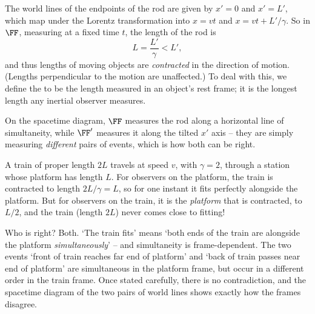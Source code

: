 \documentclass[a4paper]{scrartcl}
\begin{document}
The world lines of the endpoints of the rod are given by $x' = 0$ and $x' = L'$, which map under the Lorentz transformation into $x = vt$ and $x = vt + L'/\gamma$.
So in $\FF$, measuring at a fixed time $t$, the length of the rod is
$$
L = \frac{L'}{\gamma} < L',
$$
and thus lengths of moving objects are \emph{contracted} in the direction of motion. (Lengths perpendicular to the motion are unaffected.) To deal with this, we define the  to be the length measured in an object's rest frame; it is the longest length any inertial observer measures.

\begin{center}
\end{center}

On the spacetime diagram, $\FF$ measures the rod along a horizontal line of simultaneity, while $\FF'$ measures it along the tilted $x'$ axis -- they are simply measuring \emph{different} pairs of events, which is how both can be right.

\begin{example}
	A train of proper length $2L$ travels at speed $v$, with $\gamma = 2$, through a station whose platform has length $L$. For observers on the platform, the train is contracted to length $2L/\gamma = L$, so for one instant it fits perfectly alongside the platform. But for observers on the train, it is the \emph{platform} that is contracted, to $L/2$, and the train (length $2L$) never comes close to fitting!

	Who is right? Both. `The train fits' means `both ends of the train are alongside the platform \emph{simultaneously}' -- and simultaneity is frame-dependent. The two events `front of train reaches far end of platform' and `back of train passes near end of platform' are simultaneous in the platform frame, but occur in a different order in the train frame. Once stated carefully, there is no contradiction, and the spacetime diagram of the two pairs of world lines shows exactly how the frames disagree.
\end{example}
\end{document}
